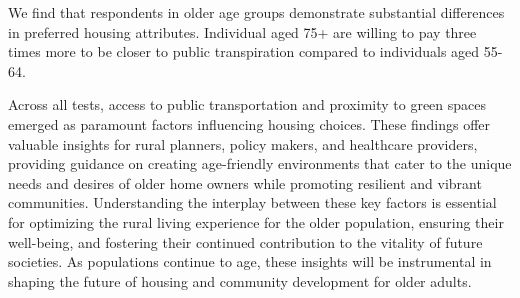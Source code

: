 \documentclass[3p,11pt ]{elsarticle}
\begin{document}
We find that respondents in older age groups demonstrate substantial differences in preferred housing attributes.
Individual aged 75+ are willing to pay three times more to be closer to public transpiration compared to individuals aged 55-64.


Across all tests, access to public transportation and proximity to green spaces emerged as paramount factors influencing housing choices. These findings offer valuable insights for rural planners, policy makers, and healthcare providers, providing guidance on creating age-friendly environments that cater to the unique needs and desires of older home owners while promoting resilient and vibrant communities. Understanding the interplay between these key factors is essential for optimizing the rural living experience for the older population, ensuring their well-being, and fostering their continued contribution to the vitality of future societies. As populations continue to age, these insights will be instrumental in shaping the future of housing and community development for older adults.

\newpage


\pagebreak




\end{document}
